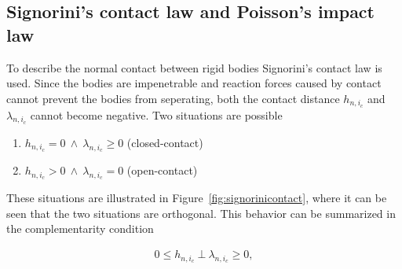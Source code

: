 \documentclass[../DC2017114Bouma.tex]{subfiles}
\begin{document}
\subsection{Signorini's contact law and Poisson's impact law}
To describe the normal contact between rigid bodies Signorini's contact law is used. Since the bodies are impenetrable and reaction forces caused by contact cannot prevent the bodies from seperating, both the contact distance $h_{n,i_c}$ and $\lambda_{n,i_c}$ cannot become negative. Two situations are possible

\begin{enumerate}
\item $h_{n,i_c}=0\ \wedge\ \lambda_{n,i_c} \geq 0$ (closed-contact)
\item $h_{n,i_c}>0\ \wedge\ \lambda_{n,i_c} = 0$ (open-contact)
\end{enumerate}

These situations are illustrated in Figure~\ref{fig:signorinicontact}, where it can be seen that the two situations are orthogonal. This behavior can be summarized in the complementarity condition

\begin{align}
0\leq h_{n,i_c}\ \bot\ \lambda_{n,i_c} \geq 0,\label{eq:signorini}
\end{align}
\end{document}
